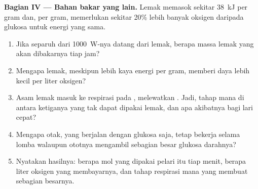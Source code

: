 \begin{problem}
\medskip
\noindent\textbf{Bagian IV --- Bahan bakar yang lain.}
Lemak memasok sekitar \qty{38}{kJ} per gram dan, per gram, memerlukan
sekitar 20\% lebih banyak oksigen daripada glukosa untuk energi yang sama.
\begin{enumerate}[resume]
  \item Jika separuh dari \qty{1000}{W}-nya datang dari lemak, berapa
        massa lemak yang akan dibakarnya tiap jam?
  \item Mengapa lemak, meskipun lebih kaya energi per gram, memberi
        daya lebih kecil per liter oksigen?
  \item Asam lemak masuk ke respirasi pada , melewatkan
        . Jadi, tahap mana di antara ketiganya yang tak dapat
        dipakai lemak, dan apa akibatnya bagi lari cepat?
  \item Mengapa otak, yang berjalan dengan glukosa saja, tetap bekerja
        selama lomba walaupun ototnya mengambil sebagian besar glukosa
        darahnya?
  \item Nyatakan hasilnya: berapa mol  yang dipakai pelari itu tiap
        menit, berapa liter oksigen yang membayarnya, dan tahap
        respirasi mana yang membuat sebagian besarnya.
\end{enumerate}
\end{problem}
